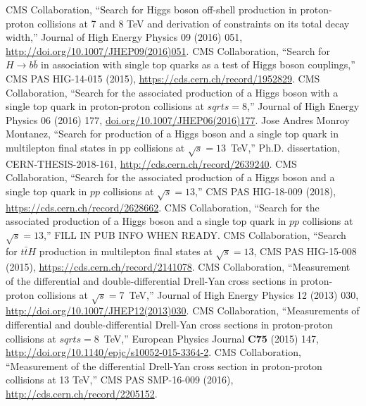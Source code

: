 \begin{thebibliography}{99}
%
    CMS Collaboration, ``Search for Higgs boson off-shell production in proton-proton collisions at 7 and 8 TeV and derivation of constraints on its total decay width,'' Journal of High Energy Physics 09 (2016) 051, \url{http://doi.org/10.1007/JHEP09(2016)051}.
%
%
 CMS Collaboration, ``Search for $H \to b\bar{b}$ in
  association with single top quarks as a test of Higgs boson couplings,'' CMS PAS HIG-14-015 (2015), \url{https://cds.cern.ch/record/1952829}.
%
 CMS Collaboration, ``Search for the associated
  production of a Higgs boson with a single top quark in proton-proton
  collisions at $sqrt{s} = 8$\TeV,'' Journal of High Energy Physics 06 (2016) 177, \url{doi.org/10.1007/JHEP06(2016)177}.
%
 Jose Andres Monroy Montanez, ``Search for production of a Higgs boson and a single top quark in multilepton final states in pp collisions at $\sqrt{s} = 13$~TeV,'' Ph.D. dissertation, CERN-THESIS-2018-161, \url{http://cds.cern.ch/record/2639240}.
%
 CMS Collaboration, ``Search for the associated
    production of a Higgs boson and a single top quark in $pp$ collisions
    at $\sqrt{s} = 13$\TeV,'' CMS PAS HIG-18-009 (2018),
    \url{https://cds.cern.ch/record/2628662}.
%
 CMS Collaboration, ``Search for the associated
    production of a Higgs boson and a single top quark in $pp$ collisions
    at $\sqrt{s} = 13$\TeV,'' FILL IN PUB INFO WHEN READY.
%
 CMS Collaboration, ``Search for $t\bar{t}H$
  production in multilepton final states at $\sqrt{s} = 13$\TeV, CMS PAS
  HIG-15-008 (2015), \url{https://cds.cern.ch/record/2141078}.
%
%
    CMS Collaboration, ``Measurement of the differential and double-differential Drell-Yan cross sections in proton-proton collisions at $\sqrt{s}=$7~TeV,''
    Journal of High Energy Physics 12 (2013) 030, \url{http://doi.org/10.1007/JHEP12(2013)030}.
%
    CMS Collaboration, ``Measurements of differential and double-differential Drell-Yan cross sections in proton-proton collisions at $sqrt{s}=$8~TeV,''
    European Physics Journal {\bf C75} (2015) 147, \url{http://doi.org/10.1140/epjc/s10052-015-3364-2}.
%
    CMS Collaboration, ``Measurement of the differential Drell-Yan cross section in proton-proton collisions at 13 TeV,'' 
    CMS PAS SMP-16-009 (2016), \url{http://cds.cern.ch/record/2205152}.
%
%

\end{thebibliography}
